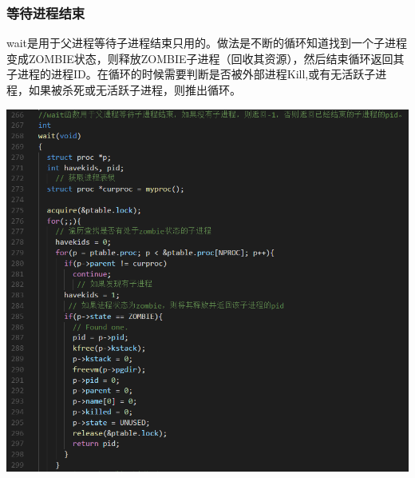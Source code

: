   \subsubsection{等待进程结束}

  wait是用于父进程等待子进程结束只用的。做法是不断的循环知道找到一个子进程变成ZOMBIE状态，则释放ZOMBIE子进程（回收其资源），然后结束循环返回其子进程的进程ID。在循环的时候需要判断是否被外部进程Kill,或有无活跃子进程，如果被杀死或无活跃子进程，则推出循环。

  \includegraphics[width=6in]{figures/process/fig16.png}
